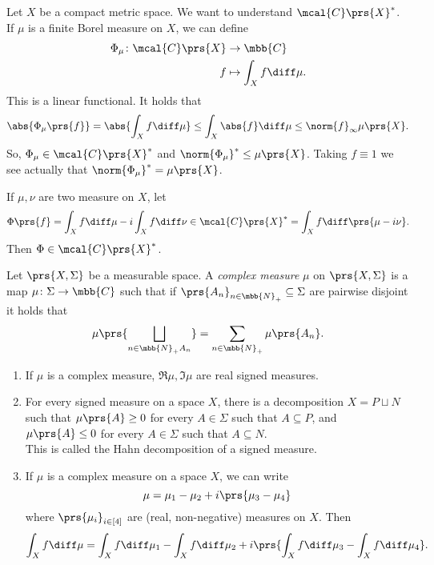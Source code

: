 \documentclass[10pt, twoside]{book}
\begin{document}
\begin{example}
Let $X$ be a compact metric space. We want to understand $\mcal{C}\prs{X}^*$. If $\mu$ is a finite Borel measure on $X$, we can define
\begin{align*}
\Phi_\mu \colon \mcal{C}\prs{X} &\to \mbb{C} \\
f &\mapsto \int_X f \diff \mu \text{.}
\end{align*}
This is a linear functional.
It holds that
\[\abs{\Phi_\mu\prs{f}} = \abs{\int_X f \diff \mu} \leq \int_X \abs{f} \diff \mu \leq \norm{f}_\infty \mu\prs{X} \text{.}\]
So, $\Phi_\mu \in \mcal{C}\prs{X}^*$ and $\norm{\Phi_\mu}^* \leq \mu\prs{X}$. Taking $f \equiv 1$ we see actually that $\norm{\Phi_\mu}^* = \mu\prs{X}$.

If $\mu,\nu$ are two measure on $X$, let
\[\Phi\prs{f} = \int_X f \diff \mu -i \int_X f \diff \nu \in \mcal{C}\prs{X}^* = \int_X f \diff \prs{\mu - i\nu} \text{.}\]
Then $\Phi \in \mcal{C}\prs{X}^*$.
\end{example}

\begin{definition}
Let $\prs{X,\Sigma}$ be a measurable space. A \emph{complex measure} $\mu$ on $\prs{X, \Sigma}$ is a map $\mu \colon \Sigma \to \mbb{C}$ such that if $\prs{A_n}_{n \in \mbb{N}_+} \subseteq \Sigma$ are pairwise disjoint it holds that
\[\mu\prs{\bigsqcup_{n \in \mbb{N}_+ A_n}} = \sum_{n \in \mbb{N}_+} \mu\prs{A_n} \text{.}\]
\end{definition}

\begin{fact}
\begin{enumerate}
\item If $\mu$ is a complex measure, $\Re \mu, \Im \mu$ are real signed measures.
\item For every signed measure on a space $X$, there is a decomposition $X = P \sqcup N$ such that $\mu\prs{A} \geq 0$ for every $A \in \Sigma$ such that $A \subseteq P$, and $\mu\prs{A} \leq 0$ for every $A \in \Sigma$ such that $A \subseteq N$.\\
This is called the Hahn decomposition of a signed measure.
\item If $\mu$ is a complex measure on a space $X$, we can write
\[\mu = \mu_1 - \mu_2 + i\prs{\mu_3 - \mu_4}\]
where $\prs{\mu_i}_{i \in [4]}$ are (real, non-negative) measures on $X$.
Then
\[\int_X f \diff \mu = \int_X f \diff \mu_1 - \int_X f \diff \mu_2 + i \prs{\int_X f \diff \mu_3 - \int_X f \diff \mu_4} \text{.}\]
\end{enumerate}
\end{fact}
\end{document}
